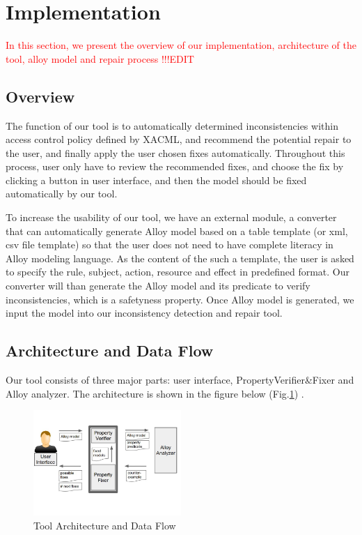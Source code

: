\documentclass{acm_proc_article-sp}
\begin{document}
\section{Implementation}

\textcolor{red}{In this section, we present the overview of our implementation, architecture of the tool, alloy model and repair process !!!EDIT}

\subsection{Overview}
The function of our tool is to automatically determined inconsistencies within access control policy defined by XACML, and recommend the potential repair to the user, and finally apply the user chosen fixes automatically. Throughout this process, user only have to review the recommended fixes, and choose the fix by clicking a button in user interface, and then the model should be fixed automatically by our tool. 

To increase the usability of our tool, we have an external module, a converter that can automatically generate Alloy model based on a table template (or xml, csv file template) so that the user does not need to have complete literacy in Alloy modeling language. As the content of the such a template, the user is asked to specify the rule, subject, action, resource and effect in predefined format. Our converter will than generate the Alloy model and its predicate to verify inconsistencies, which is a safetyness property. Once Alloy model is generated, we input the model into our inconsistency detection and repair tool. 

\subsection{Architecture and Data Flow}

Our tool consists of three major parts: user interface, PropertyVerifier\&Fixer and Alloy analyzer. The architecture is shown in the figure below (Fig.\ref{fig:Architecture}) .\\

\begin{figure}[h]
\includegraphics[width=0.5\textwidth]{DataFlow.JPG}
\caption{Tool Architecture and Data Flow}    
  \label{fig:Architecture}
\end{figure}
\end{document}
